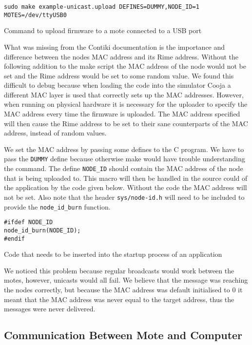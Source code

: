 \begin{listing}
\begin{verbatim}
sudo make example-unicast.upload DEFINES=DUMMY,NODE_ID=1 MOTES=/dev/ttyUSB0
\end{verbatim}
\caption{Command to upload firmware to a mote connected to a USB port}
\end{listing}

What was missing from the Contiki documentation is the importance and difference between the nodes MAC address and its Rime address. Without the following addition to the make script the MAC address of the node would not be set and the Rime address would be set to some random value. We found this difficult to debug because when loading the code into the simulator Cooja a different MAC layer is used that correctly sets up the MAC addresses. However, when running on physical hardware it is necessary for the uploader to specify the MAC address every time the firmware is uploaded. The MAC address specified will then cause the Rime address to be set to their sane counterparts of the MAC address, instead of random values.

We set the MAC address by passing some defines to the C program. We have to pass the \verb|DUMMY| define because otherwise make would have trouble understanding the command. The define \verb|NODE_ID| should contain the MAC address of the node that is being uploaded to. This macro will then be handled in the source could of the application by the code given below. Without the code the MAC address will not be set. Also note that the header \verb|sys/node-id.h| will need to be included to provide the \verb|node_id_burn| function.

\begin{listing} 
\begin{verbatim}
#ifdef NODE_ID
node_id_burn(NODE_ID);
#endif
\end{verbatim}
\caption{Code that needs to be inserted into the startup process of an application}
\end{listing}

We noticed this problem because regular broadcasts would work between the motes, however, unicasts would all fail. We believe that the message was reaching the nodes correctly, but because the MAC address was default initialised to 0 it meant that the MAC address was never equal to the target address, thus the messages were never delivered.


\subsection{Communication Between Mote and Computer}

